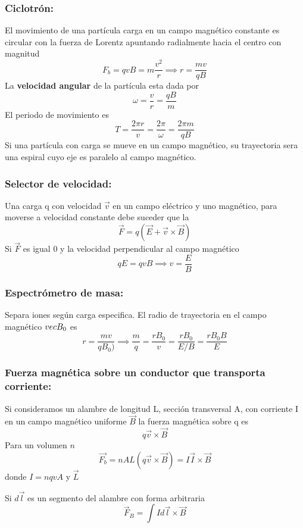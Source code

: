 \documentclass[a4paper, 10pt]{article}
\begin{document}
\begin{multicols*}{2}
	\subsubsection{Ciclotrón:} El movimiento de una partícula carga en un campo magnético constante es circular con la fuerza de Lorentz apuntando radialmente hacia el centro con magnitud
	$$F_b = qvB = m \frac{v^2}{r} \implies r = \frac{mv}{qB}$$
	La  \textbf{velocidad angular} de la partícula esta dada por 
	$$\omega=\frac{v}{r}=\frac{qB}{m}$$
	El periodo de movimiento es 
	$$T=\frac{2\pi r}{v}=\frac{2\pi}{\omega}=\frac{2\pi m}{qB}$$
	Si una partícula con carga se mueve en un campo magnético, su trayectoria sera una espiral cuyo eje es paralelo al campo magnético.\\
	     
	\subsubsection{Selector de velocidad:} Una carga q con velocidad $\vec{v}$ en un campo eléctrico y uno magnético, para moverse a velocidad constante debe suceder que la 
	$$\vec{F} = q(\vec{E}+\vec{v}\times\vec{B})$$
	Si $\vec{F}$ es igual 0 y la velocidad perpendicular al campo magnético
	$$qE = qvB \implies v = \frac{E}{B}$$
	     
	\subsubsection{Espectrómetro de masa:} Separa iones según carga especifica. 
	El radio de trayectoria en el campo magnético $\\vec{B}_0$ es
	$$r = \frac{mv}{qB_0)}\implies \frac{m}{q}=\frac{rB_0}{v}=\frac{rB_0}{E/B}=\frac{rB_0B}{E}$$
	      
	\subsubsection{Fuerza magnética sobre un conductor que transporta corriente:}
	Si consideramos un alambre de longitud L, sección transversal A, con corriente I en un campo magnético uniforme $\vec{B}$
	la fuerza magnética sobre q es
	$$q\vec{v}\times\vec{B}$$
	Para un volumen $n$
	$$\vec{F_b} = nAL(q\vec{v}\times\vec{B}) = I\vec{I} \times \vec{B}$$
	donde $I = nqvA$ y $\vec{L}$
	    
	Si $d\vec{l}$ es un segmento del alambre con forma arbitraria
	$$\vec{F}_B = \int I d\vec{l}\times\vec{B}$$
	    

\end{multicols*}
\end{document}

